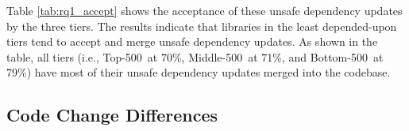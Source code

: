 \documentclass[sigconf,screen]{acmart}
\newcommand\toppkg{Top-500}
\newcommand\midpkg{Middle-500}
\newcommand\lowpkg{Bottom-500}
\begin{document}
\begin{sloppy}
Table \ref{tab:rq1_accept} shows the acceptance of these unsafe dependency updates by the three tiers.
The results indicate that libraries in the least depended-upon tiers tend to accept and merge unsafe dependency updates.
As shown in the table, all tiers (i.e., \toppkg~at 70\%, \midpkg~at 71\%, and \lowpkg~at 79\%) have most of their unsafe dependency updates merged into the codebase. 


\subsection{Code Change Differences}

\begin{table}[]
\centering
\caption{The frequency of six unsafe dependency update types, comparing those labeled ``require attention''}
\label{tab:new_rq3}
\end{table}
\end{sloppy}
\end{document}
